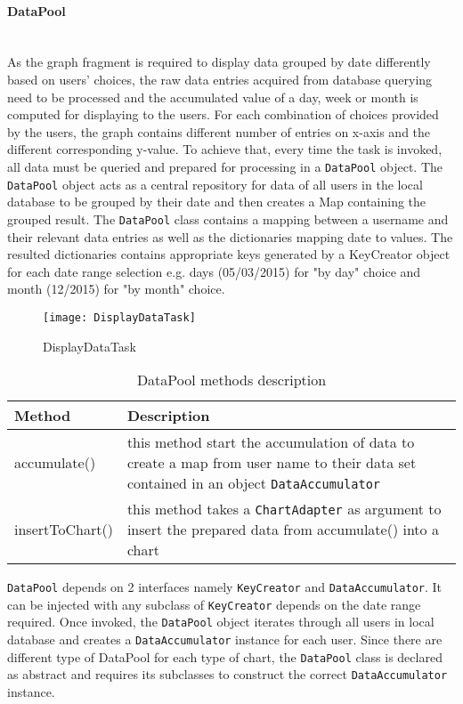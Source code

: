 \paragraph{DataPool}\mbox{} \\
As the graph fragment is required to display data grouped by date differently based on users' choices, the raw data
entries acquired from database querying need to be processed and the accumulated value of a day, week or month is
computed for displaying to the users. For each combination of choices provided by the users, the graph contains
different number of entries on x-axis and the different corresponding y-value. To achieve that, every time the task is
invoked, all data must be queried and prepared for processing in a \texttt{DataPool} object. The \texttt{DataPool}
object acts as a central repository for data of all users in the local database to be grouped by their date and then
creates a Map containing the grouped result. The \texttt{DataPool} class contains a mapping between a username and their
relevant data entries as well as the dictionaries mapping date to values. The resulted dictionaries contains appropriate
keys generated by a KeyCreator object for each date range selection e.g. days (05/03/2015) for "by day" choice and month
(12/2015) for "by month" choice.

\begin{figure}[!ht]
    \caption{DisplayDataTask}
    \centering
    \texttt{[image: DisplayDataTask]}
\end{figure}

\begin{table}
\begin{center}
    \begin{tabularx}{\textwidth}{| l | X |}
        \hline Method & Description \\
        \hline accumulate() & 
            this method start the accumulation of data to create a map from user name to their data set contained in an
            object \texttt{DataAccumulator} \\
        \hline insertToChart() &
            this method takes a \texttt{ChartAdapter} as argument to insert the prepared data from accumulate() into a
            chart \\
        \hline
    \end{tabularx}
\end{center}
\caption{DataPool methods description}
\end{table}
\noindent \texttt{DataPool} depends on 2 interfaces namely \texttt{KeyCreator} and \texttt{DataAccumulator}. It can be
injected with any subclass of \texttt{KeyCreator} depends on the date range required.  Once invoked, the
\texttt{DataPool} object iterates through all users in local database and creates a \texttt{DataAccumulator} instance
for each user. Since there are different type of DataPool for each type of chart, the \texttt{DataPool} class is
declared as abstract and requires its subclasses to construct the correct \texttt{DataAccumulator} instance. 

